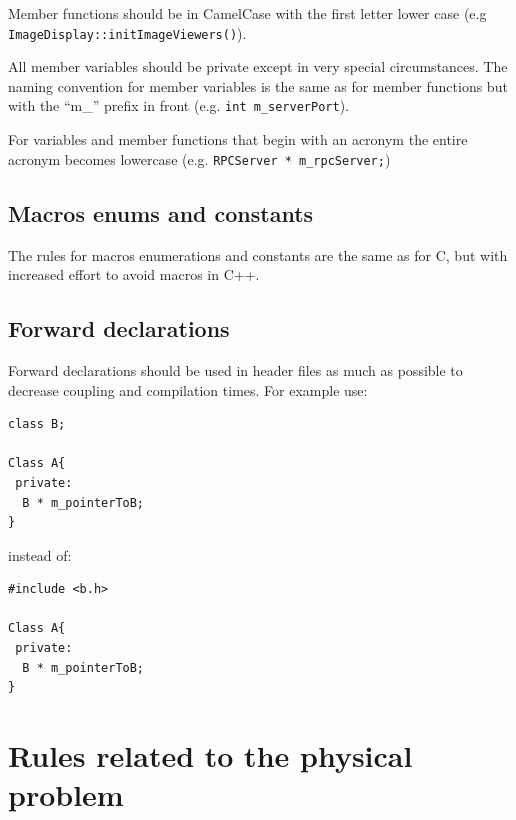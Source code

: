 \documentclass[12pt]{article}
\newenvironment{sourcestyle}{}{}%
\begin{document}
Member functions should be in CamelCase with the first letter lower case (e.g {\tt ImageDisplay::initImageViewers()}).

All member variables should be private except in very special circumstances. 
The naming convention for member variables is the same as for member functions but with the ``m\_'' prefix in front (e.g. {\tt int m\_serverPort}).

For variables and member functions that begin with an acronym the entire acronym becomes lowercase (e.g. {\tt RPCServer * m\_rpcServer;})
\subsection{Macros enums and constants}
The rules for macros enumerations and constants are the same as for C, but with increased effort to avoid macros in C++.

\subsection{Forward declarations}
Forward declarations should be used in header files as much as possible to decrease coupling and compilation times.
For example use:
\begin{sourcestyle}
\begin{verbatim}
class B;

Class A{
 private:
  B * m_pointerToB;
}
\end{verbatim}
\end{sourcestyle}
instead of:
\begin{sourcestyle}
\begin{verbatim}
#include <b.h>

Class A{
 private:
  B * m_pointerToB;
}
\end{verbatim}
\end{sourcestyle}

\section{Rules related to the physical problem}
\end{document}
